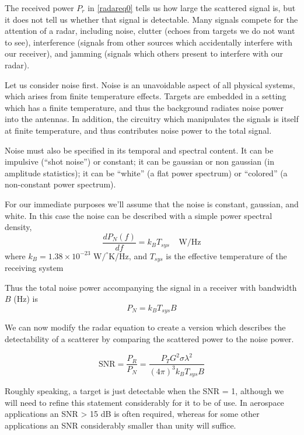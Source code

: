 The received power $P_r$ in \eqref{radareq0} tells us how large the
scattered signal is, but it does not tell us whether that signal is
detectable.  Many signals compete for the attention of a radar,
including noise, clutter (echoes from targets we do not want to see),
interference (signals from other sources which accidentally interfere
with our receiver), and jamming (signals which others present to
interfere with our radar).

Let us consider noise first.  Noise is an unavoidable aspect of all
physical systems, which arises from finite temperature effects.  
Targets are embedded in a setting which has a finite temperature, and
thus the background radiates noise power into the antennas.  In
addition, the circuitry which manipulates the signals is itself at
finite temperature, and thus contributes noise power to the total
signal.

Noise must also be specified in its temporal and spectral content.  It
can be impulsive (``shot noise'') or constant; it can be gaussian or
non gaussian (in amplitude statistics); it can be ``white'' (a flat
power spectrum) or ``colored'' (a non-constant power spectrum).

For our immediate purposes we'll assume that the noise is constant,
gaussian, and white.  In this case the noise can be described with a
simple power spectral density,
\begin{equation}
\frac{dP_N(f)}{df} = k_B T_{sys} \;\;\;\; \textrm{W/Hz}
\end{equation}
where $k_B = 1.38\times 10^{-23}$ W$/^\circ$K/Hz, and $T_{sys}$ is the
effective temperature of the receiving system

Thus the total noise power accompanying the signal in a receiver with
bandwidth $B$ (Hz) is
\begin{equation}
P_N = k_B T_{sys} B
\end{equation}

We can now modify the radar equation to create a version which
describes the detectability of a scatterer by comparing the scattered
power to the noise power.

\begin{equation}
\textrm{SNR} = \frac{P_R}{P_N} = \frac{P_T G^2 \sigma
\lambda^2}{(4\pi)^3 k_B T_{sys} B}
\end{equation}

Roughly speaking, a target is just detectable when the SNR = 1,
although we will need to refine this statement considerably for it to
be of use.  In aerospace applications an SNR > 15 dB is often
required, whereas for some other applications an SNR considerably
smaller than unity will suffice.


